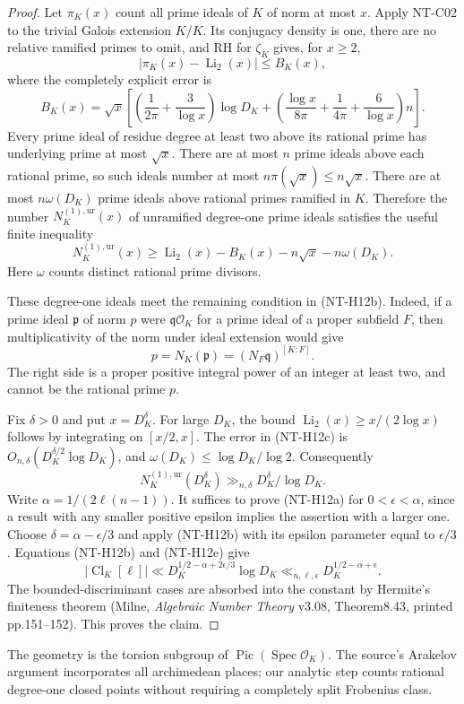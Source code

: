 \documentclass[11pt,a4paper]{article}
\begin{document}
\begin{proof}
Let $\pi_K(x)$ count all prime ideals of $K$ of norm at most $x$.
Apply NT-C02 to the trivial Galois extension $K/K$. Its conjugacy density
is one, there are no relative ramified primes to omit, and RH for
$\zeta_K$ gives, for $x\ge2$,
\[
 |\pi_K(x)-\operatorname{Li}_2(x)|\le B_K(x),
\]
where the completely explicit error is
\[
 B_K(x)=\sqrt x\left[
 \left(\frac1{2\pi}+\frac3{\log x}\right)\log D_K+
 \left(\frac{\log x}{8\pi}+\frac1{4\pi}+\frac6{\log x}\right)n
                  \right].                            \tag{NT-H12c}
\]
Every prime ideal of residue degree at least two above its rational
prime has underlying prime at most $\sqrt x$. There are at most $n$
prime ideals above each rational prime, so such ideals number at most
$n\pi(\sqrt x)\le n\sqrt x$. There are at most $n\omega(D_K)$
prime ideals above rational primes ramified in $K$. Therefore the
number $N_K^{(1),\mathrm{ur}}(x)$ of unramified degree-one prime ideals
satisfies the useful finite inequality
\[
 N_K^{(1),\mathrm{ur}}(x)
   \ge\operatorname{Li}_2(x)-B_K(x)-n\sqrt x-n\omega(D_K).
                                                        \tag{NT-H12d}
\]
Here $\omega$ counts distinct rational prime divisors.

These degree-one ideals meet the remaining condition in (NT-H12b).
Indeed, if a prime ideal $\mathfrak p$ of norm $p$ were
$\mathfrak q\mathcal O_K$ for a prime ideal of a proper subfield $F$,
then multiplicativity of the norm under ideal extension would give
\[
 p=N_K(\mathfrak p)=(N_F\mathfrak q)^{[K:F]}.
\]
The right side is a proper positive integral power of an integer
at least two, and cannot be the rational prime $p$.

Fix $\delta>0$ and put $x=D_K^\delta$. For large $D_K$, the bound
$\operatorname{Li}_2(x)\ge x/(2\log x)$ follows by integrating on
$[x/2,x]$. The error in (NT-H12c) is
$O_{n,\delta}(D_K^{\delta/2}\log D_K)$, and
$\omega(D_K)\le\log D_K/\log2$. Consequently
\[
 N_K^{(1),\mathrm{ur}}(D_K^\delta)
                  \gg_{n,\delta}D_K^\delta/\log D_K.   \tag{NT-H12e}
\]
Write $\alpha=1/(2\ell(n-1))$. It suffices to prove (NT-H12a) for
$0<\epsilon<\alpha$, since a result with any smaller positive epsilon
implies the assertion with a larger one. Choose
$\delta=\alpha-\epsilon/3$ and apply (NT-H12b) with its epsilon
parameter equal to $\epsilon/3$. Equations (NT-H12b) and (NT-H12e)
give
\[
 |\operatorname{Cl}_K[\ell]|
   \ll D_K^{1/2-\alpha+2\epsilon/3}\log D_K
   \ll_{n,\ell,\epsilon}D_K^{1/2-\alpha+\epsilon}.
\]
The bounded-discriminant cases are absorbed into the constant by
Hermite's finiteness theorem (Milne, \emph{Algebraic Number Theory}
v3.08, Theorem8.43, printed pp.151--152). This proves the claim.
\end{proof}
The geometry is the torsion subgroup of
$\operatorname{Pic}(\operatorname{Spec}\mathcal O_K)$.
The source's Arakelov argument incorporates all archimedean places;
our analytic step counts rational degree-one closed points without
requiring a completely split Frobenius class.
\end{document}
